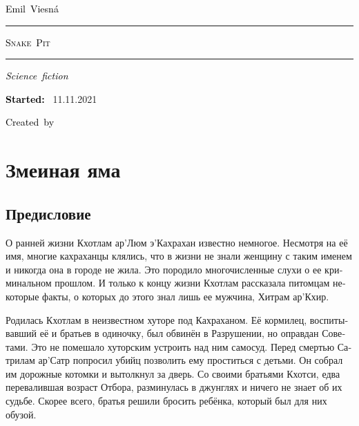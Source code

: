 \documentclass[a4paper,12pt,fleqn]{book}\usepackage{cooltooltips}\usepackage{polyglossia}\setdefaultlanguage[babelshorthands=true]{russian}\setotherlanguage{english}\defaultfontfeatures{Ligatures=TeX,Mapping=tex-text} \usepackage{xcolor}\definecolor{lightgray}{HTML}{bbbbbb}\color{lightgray}\newcommand{\ml}[3]{\textenglish{\textcolor{black}{#3}} }
\newcommand{\tofaauthor}{\ml{$0$}{Эмиль~Весна}{Emil~Viesn\'{a}}}
\newcommand{\tofatitle}{\ml{$0$}{ЗМЕИНАЯ~ЯМА}{Snake~Pit}}
\newcommand{\tofastarted}{11.11.2021}
\newcommand{\asterism}{\vspace{1em}{\centering\Large\bfseries$\ast~\ast~\ast$\par}\vspace{1em}}
\begin{document}

\begin{titlepage}
{\centering{~\par}\vspace{0.25\textheight}
{\LARGE\tofaauthor}\par
\vspace{1.0cm}\rule{17em}{1pt}\par\vspace{0.3cm}
{\Huge\textsc{\tofatitle}\par}
\vspace{0.3cm}\rule{17em}{2pt}\par\vspace{1.0cm}
{\Large\textit{\ml{$0$}{Фантастический~роман}{Science~fiction}}\par}
\vspace{0.5cm}\asterism\par\vspace{1.0cm}
{\textbf{\ml{$0$}{Начато:}{Started:}}~\tofastarted\par}\vfill
{\Large\ml{$0$}{Создано~в}{Created~by}~\XeLaTeX}\par}
\end{titlepage}

\tableofcontents

\part{Змеиная яма}

\chapter{Предисловие}

О ранней жизни Кхотлам ар'Люм э'Кахрахан известно немногое.
Несмотря на её имя, многие кахраханцы клялись, что в жизни не знали женщину с таким именем и никогда она в городе не жила.
Это породило многочисленные слухи о ее криминальном прошлом.
И только к концу жизни Кхотлам рассказала питомцам некоторые факты, о которых до этого знал лишь ее мужчина, Хитрам ар'Кхир.

Родилась Кхотлам в неизвестном хуторе под Кахраханом.
Её кормилец, воспитывавший её и братьев в одиночку, был обвинён в Разрушении, но оправдан Советами.
Это не помешало хуторским устроить над ним самосуд.
Перед смертью Сатрилам ар'Сатр попросил убийц позволить ему проститься с детьми.
Он собрал им дорожные котомки и вытолкнул за дверь.
Со своими братьями Кхотси, едва перевалившая возраст Отбора, разминулась в джунглях и ничего не знает об их судьбе.
Скорее всего, братья решили бросить ребёнка, который был для них обузой.
\end{document}
